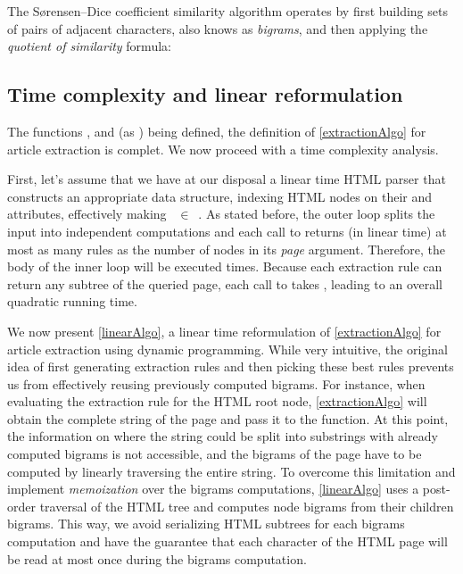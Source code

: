 \similarityTable

The Sørensen–Dice coefficient similarity algorithm operates by first building sets of pairs of adjacent characters, also knows as \emph{bigrams}, and then applying the \emph{quotient of similarity} formula:

\similarityAlgo


\subsection{Time complexity and linear reformulation}
\label{timecomplexityandlinearreformulation}

The functions ,  and  (as ) being defined, the definition of \autoref{extractionAlgo} for article extraction is complet. We now proceed with a time complexity analysis.

First, let's assume that we have at our disposal a linear time HTML parser that constructs an appropriate data structure, indexing HTML nodes on their  and  attributes, effectively making ~$\in$~. As stated before, the outer loop splits the input into independent computations and each call to  returns (in linear time) at most as many rules as the number of nodes in its \emph{page} argument. Therefore, the body of the inner loop will be executed  times. Because each extraction rule can return any subtree of the queried page, each call to  takes , leading to an overall quadratic running time.

We now present \autoref{linearAlgo}, a linear time reformulation of \autoref{extractionAlgo} for article extraction using dynamic programming. While very intuitive, the original idea of first generating extraction rules and then picking these best rules prevents us from effectively reusing previously computed bigrams. For instance, when evaluating the extraction rule for the HTML root node, \autoref{extractionAlgo} will obtain the complete string of the page and pass it to the  function. At this point, the information on where the string could be split into substrings with already computed bigrams is not accessible, and the bigrams of the page have to be computed by linearly traversing the entire string. To overcome this limitation and implement \emph{memoization} over the bigrams computations, \autoref{linearAlgo} uses a post-order traversal of the HTML tree and computes node bigrams from their children bigrams. This way, we avoid serializing HTML subtrees for each bigrams computation and have the guarantee that each character of the HTML page will be read at most once during the bigrams computation.

